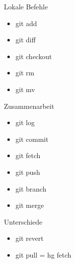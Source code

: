 \documentclass[presentation]{beamer}
\begin{document}
\begin{frame}{Lokale Befehle}
  \begin{itemize}[<+- | alert@+>]
  \item git add
  \item git diff
  \item git checkout
  \item git rm
  \item git mv
  \end{itemize}
\end{frame}
\begin{frame}{Zusammenarbeit}
  \begin{itemize}[<+- | alert@+>]
  \item git log
  \item git commit
  \item git fetch
  \item git push
  \item git branch
  \item git merge
  \end{itemize}
\end{frame}
\begin{frame}{Unterschiede}
  \begin{itemize}[<+- | alert@+>]
  \item git revert
  \item git pull = hg fetch
  \end{itemize}
\end{frame}
\end{document}
